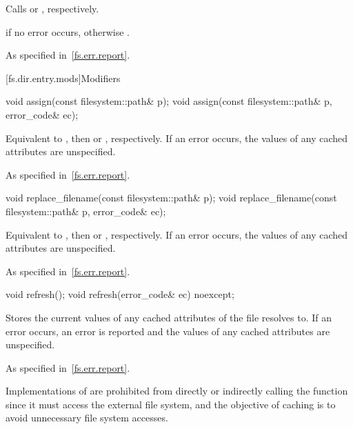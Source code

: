 \begin{itemdescr}
\pnum
\effects
Calls  or , respectively.

\pnum
\ensures
{} if no error occurs,
otherwise .

\pnum
\throws
As specified in~\ref{fs.err.report}.
\end{itemdescr}

[fs.dir.entry.mods]{Modifiers}

%
\begin{itemdecl}
void assign(const filesystem::path& p);
void assign(const filesystem::path& p, error_code& ec);
\end{itemdecl}

\begin{itemdescr}
\pnum
\effects
Equivalent to ,
then  or , respectively.
If an error occurs, the values of any cached attributes are unspecified.

\pnum
\throws
As specified in~\ref{fs.err.report}.
\end{itemdescr}

%
\begin{itemdecl}
void replace_filename(const filesystem::path& p);
void replace_filename(const filesystem::path& p, error_code& ec);
\end{itemdecl}

\begin{itemdescr}
\pnum
\effects
Equivalent to ,
then  or , respectively.
If an error occurs, the values of any cached attributes are unspecified.

\throws
As specified in~\ref{fs.err.report}.
\end{itemdescr}

%
\begin{itemdecl}
void refresh();
void refresh(error_code& ec) noexcept;
\end{itemdecl}

\begin{itemdescr}
\pnum
\effects
Stores the current values of any cached attributes of the file  resolves to.
If an error occurs, an error is reported
and the values of any cached attributes are unspecified.

\pnum
\throws
As specified in~\ref{fs.err.report}.

\pnum
\begin{note}
Implementations of 
are prohibited from directly or indirectly calling the  function
since it must access the external file system,
and the objective of caching is to avoid unnecessary file system accesses.
\end{note}
\end{itemdescr}

